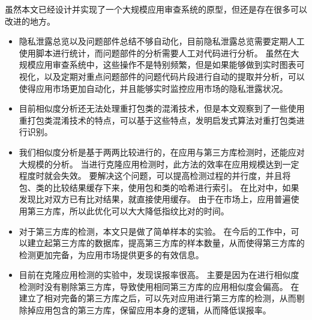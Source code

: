 虽然本文已经设计并实现了一个大规模应用审查系统的原型，但还是存在很多可以改进的地方。
\begin{itemize}
	\item 隐私泄露总览以及问题部件总结不够自动化，目前隐私泄露总览需要定期人工使用脚本进行统计，而问题部件的分析需要人工对代码进行分析。
	虽然在大规模应用审查系统中，这些操作不是特别频繁，但是如果能够做到实时图表可视化，以及定期对重点问题部件的问题代码片段进行自动的提取并分析，可以使得应用市场更加自动化，并且能够实时监控应用市场的隐私泄露状况。
	\item 目前相似度分析还无法处理重打包类的混淆技术，但是本文观察到了一些使用重打包类混淆技术的特点，可以基于这些特点，发明启发式算法对重打包类进行识别。
	\item 我们相似度分析是基于两两比较进行的，在应用与第三方库检测时，还能应对大规模的分析。
	当进行克隆应用检测时，此方法的效率在应用规模达到一定程度时就会失效。
	要解决这个问题，可以提高检测过程的并行度，并且将包、类的比较结果缓存下来，使用包和类的哈希进行索引。
	在比对中，如果发现比对双方已有比对结果，就直接使用缓存。
	由于在市场上，应用普遍使用第三方库，所以此优化可以大大降低指纹比对的时间。
	\item 对于第三方库的检测，本文只是做了简单样本的实验。
	在今后的工作中，可以建立起第三方库的数据库，提高第三方库的样本数量，从而使得第三方库的检测更加完备，为应用市场提供更多的有效信息。
	\item 目前在克隆应用检测的实验中，发现误报率很高。
	主要是因为在进行相似度检测时没有剔除第三方库，导致使用相同第三方库的应用相似度会偏高。
	在建立了相对完备的第三方库之后，可以先对应用进行第三方库的检测，从而剔除掉应用包含的第三方库，保留应用本身的逻辑，从而降低误报率。
\end{itemize}

